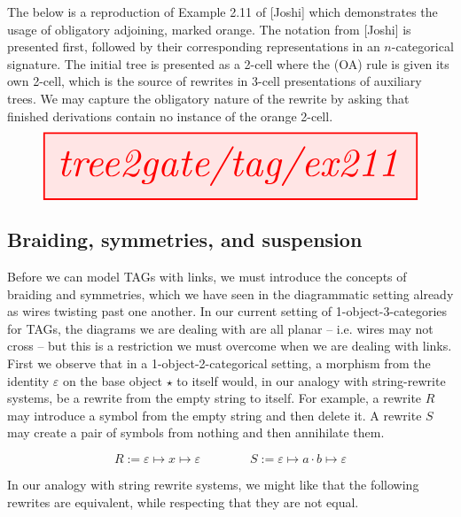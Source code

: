 \begin{example}
The below is a reproduction of Example 2.11 of [Joshi] which demonstrates the usage of obligatory adjoining, marked orange. The notation from [Joshi] is presented first, followed by their corresponding representations in an $n$-categorical signature. The initial tree is presented as a 2-cell where the (OA) rule is given its own 2-cell, which is the source of rewrites in 3-cell presentations of auxiliary trees. We may capture the obligatory nature of the rewrite by asking that finished derivations contain no instance of the orange 2-cell.
\[\resizebox{\textwidth}{!}{\tikzfig{tree2gate/tag/ex211}}\]
\end{example}

\subsection{Braiding, symmetries, and suspension}

Before we can model TAGs with links, we must introduce the concepts of braiding and symmetries, which we have seen in the diagrammatic setting already as wires twisting past one another. In our current setting of 1-object-3-categories for TAGs, the diagrams we are dealing with are all planar -- i.e. wires may not cross -- but this is a restriction we must overcome when we are dealing with links.\\

First we observe that in a 1-object-2-categorical setting, a morphism from the identity $\varepsilon$ on the base object $\star$ to itself would, in our analogy with string-rewrite systems, be a rewrite from the empty string to itself. For example, a rewrite $R$ may introduce a symbol from the empty string and then delete it. A rewrite $S$ may create a pair of symbols from nothing and then annihilate them.

\[R := \varepsilon \mapsto x \mapsto \varepsilon \quad\quad\quad\quad S := \varepsilon \mapsto a \cdot b \mapsto \varepsilon\]

In our analogy with string rewrite systems, we might like that the following rewrites are equivalent, while respecting that they are not equal.

